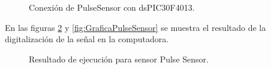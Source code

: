 	\begin{figure}[htbp!]
		\centering
		\caption{Conexión de PulseSensor con dsPIC30F4013.}
		\label{fig:ConexionPulseSensor}
	\end{figure}

En las figuras  \ref{fig:TerminalPulseSensor} y \ref{fig:GraficaPulseSensor} se muestra el resultado de la digitalización de la señal en la computadora.
	
	\begin{figure}[htbp!]
		\centering
		\caption{Resultado de ejecución para sensor Pulse Sensor.}
		\label{fig:TerminalPulseSensor}
	\end{figure}
	
